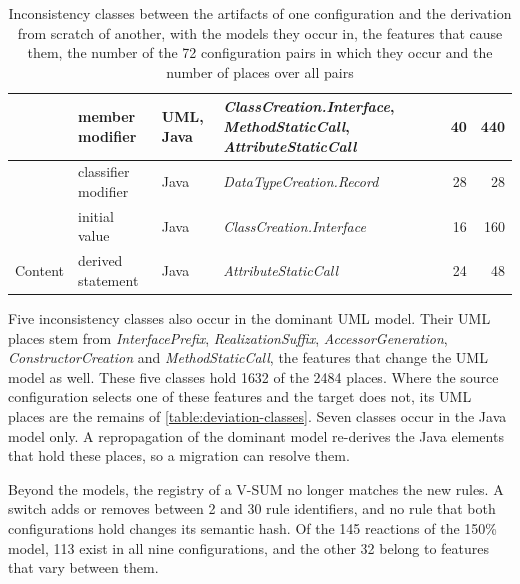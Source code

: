 \begin{table}
\begin{tabularx}{0.95\textheight}{|l|>{\raggedright\arraybackslash}X|l|>{\raggedright\arraybackslash}X|r|r|}
        \hline
                      & member modifier                              & UML, Java      & \textit{ClassCreation.Interface}, \textit{MethodStaticCall}, \textit{AttributeStaticCall} & 40             & 440             \\
        \hline
                      & classifier modifier                          & Java           & \textit{DataTypeCreation.Record}                                                          & 28             & 28              \\
        \hline
                      & initial value                                & Java           & \textit{ClassCreation.Interface}                                                          & 16             & 160             \\
        \hline
        Content       & derived statement                            & Java           & \textit{AttributeStaticCall}                                                              & 24             & 48              \\
        \hline
    \end{tabularx}
    \caption{Inconsistency classes between the artifacts of one configuration and the derivation from scratch of another, with the models they occur in, the features that cause them, the number of the 72 configuration pairs in which they occur and the number of places over all pairs}
    \label{table:inconsistency-classes}
\end{table}

Five inconsistency classes also occur in the dominant UML model.
Their UML places stem from \textit{InterfacePrefix}, \textit{RealizationSuffix}, \textit{AccessorGeneration}, \textit{ConstructorCreation} and \textit{MethodStaticCall}, the features that change the UML model as well.
These five classes hold 1632 of the 2484 places.
Where the source configuration selects one of these features and the target does not, its UML places are the remains of \autoref{table:deviation-classes}.
Seven classes occur in the Java model only.
A repropagation of the dominant model re-derives the Java elements that hold these places, so a migration can resolve them.

Beyond the models, the registry of a V-SUM no longer matches the new rules.
A switch adds or removes between 2 and 30 rule identifiers, and no rule that both configurations hold changes its semantic hash.
Of the 145 reactions of the 150\% model, 113 exist in all nine configurations, and the other 32 belong to features that vary between them.

